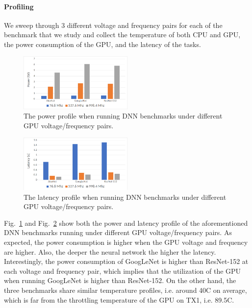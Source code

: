 \paragraph{Profiling}

We sweep through 3 different voltage and frequency pairs for each of the benchmark that we study and collect the temperature of both CPU and GPU, the power consumption of the GPU, and the latency of the tasks.

\begin{figure}[h]
    \centering
    \includegraphics[width=0.5\textwidth]{power_profile.png}
    \caption{The power profile when running DNN benchmarks under different GPU voltage/frequency pairs.}\label{fig:1}
\end{figure}

\begin{figure}[h]
    \centering
    \includegraphics[width=0.5\textwidth]{latency_profile.png}
    \caption{The latency profile when running DNN benchmarks under different GPU voltage/frequency pairs.}\label{fig:2}
\end{figure}

Fig.~\ref{fig:1} and Fig.~\ref{fig:2} show both the power and latency profile of the aforementioned DNN benchmarks running under different GPU voltage/frequency pairs. As expected, the power consumption is higher when the GPU voltage and frequency are higher. Also, the deeper the neural network the higher the latency. Interestingly, the power consumption of GoogLeNet is higher than ResNet-152 at each voltage and frequency pair, which implies that the utilization of the GPU when running GoogLeNet is higher than ResNet-152. On the other hand, the three benchmarks share similar temperature profiles, i.e. around 40C on average, which is far from the throttling temperature of the GPU on TX1, i.e. 89.5C.

